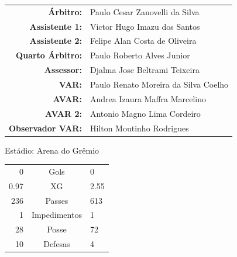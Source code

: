 \documentclass[11pt]{article}
\begin{document}
\vspace{0.5cm}
\begin{minipage}{0.65\textwidth}
\begin{center}
\begin{tabular}{rl}
\textbf{Árbitro:} & Paulo Cesar Zanovelli da Silva \\
\textbf{Assistente 1:} & Victor Hugo Imazu dos Santos \\
\textbf{Assistente 2:} & Felipe Alan Costa de Oliveira \\
\textbf{Quarto Árbitro:} & Paulo Roberto Alves Junior \\
\textbf{Assessor:} & Djalma Jose Beltrami Teixeira \\
\textbf{VAR:} & Paulo Renato Moreira da Silva Coelho \\
\textbf{AVAR:} & Andrea Izaura Maffra Marcelino \\
\textbf{AVAR 2:} & Antonio Magno Lima Cordeiro \\
\textbf{Observador VAR:} & Hilton Moutinho Rodrigues \\
\end{tabular}
\end{center}
\end{minipage}
\begin{minipage}{0.3\textwidth}
Estádio: Arena do Grêmio\\
\begin{tabular}{rcl}
0 & Gols & 0 \\
0.97 & XG & 2.55 \\
236 & Passes & 613 \\
1 & Impedimentos & 1 \\
28 & Posse & 72 \\
10 & Defesas & 4 \\
\end{tabular}
\end{minipage}
\newpage
\end{document}
